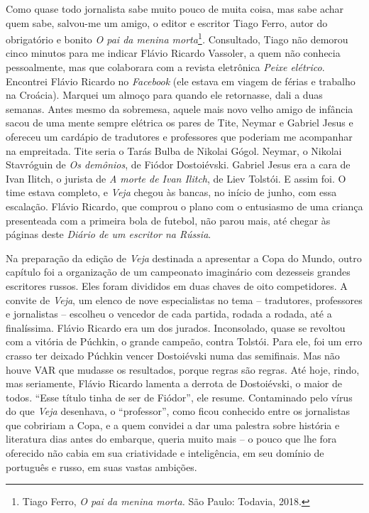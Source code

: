 Como quase todo jornalista sabe muito pouco de muita coisa, mas sabe
achar quem sabe, salvou-me um amigo, o editor e escritor Tiago Ferro,
autor do obrigatório e bonito \emph{O pai da menina morta}\footnote{Tiago
  Ferro, \emph{O pai da menina morta.} São Paulo: Todavia, 2018.}\emph{.}
Consultado, Tiago não demorou cinco minutos para me indicar Flávio
Ricardo Vassoler, a quem não conhecia pessoalmente, mas que colaborara
com a revista eletrônica \emph{Peixe elétrico}. Encontrei Flávio Ricardo
no \emph{Facebook} (ele estava em viagem de férias e trabalho na
Croácia). Marquei um almoço para quando ele retornasse, dali a duas
semanas. Antes mesmo da sobremesa, aquele mais novo velho amigo de
infância sacou de uma mente sempre elétrica os pares de Tite, Neymar e
Gabriel Jesus e ofereceu um cardápio de tradutores e professores que
poderiam me acompanhar na empreitada. Tite seria o Tarás Bulba de
Nikolai Gógol. Neymar, o Nikolai Stavróguin de \emph{Os demônios}, de
Fiódor Dostoiévski. Gabriel Jesus era a cara de Ivan Ilitch, o jurista
de \emph{A morte de Ivan Ilitch}, de Liev Tolstói. E assim foi. O time
estava completo, e \emph{Veja} chegou às bancas, no início de junho, com
essa escalação. Flávio Ricardo, que comprou o plano com o entusiasmo de
uma criança presenteada com a primeira bola de futebol, não parou mais,
até chegar às páginas deste \emph{Diário de um escritor na Rússia}.

Na preparação da edição de \emph{Veja} destinada a apresentar a Copa do
Mundo, outro capítulo foi a organização de um campeonato imaginário com
dezesseis grandes escritores russos. Eles foram divididos em duas chaves
de oito competidores. A convite de \emph{Veja}, um elenco de nove
especialistas no tema -- tradutores, professores e jornalistas --
escolheu o vencedor de cada partida, rodada a rodada, até a finalíssima.
Flávio Ricardo era um dos jurados. Inconsolado, quase se revoltou com a
vitória de Púchkin, o grande campeão, contra Tolstói. Para ele, foi um
erro crasso ter deixado Púchkin vencer Dostoiévski numa das semifinais.
Mas não houve VAR que mudasse os resultados, porque regras são regras.
Até hoje, rindo, mas seriamente, Flávio Ricardo lamenta a derrota de
Dostoiévski, o maior de todos. ``Esse título tinha de ser de Fiódor'',
ele resume. Contaminado pelo vírus do que \emph{Veja} desenhava, o
``professor'', como ficou conhecido entre os jornalistas que cobririam a
Copa, e a quem convidei a dar uma palestra sobre história e literatura
dias antes do embarque, queria muito mais -- o pouco que lhe fora
oferecido não cabia em sua criatividade e inteligência, em seu domínio
de português e russo, em suas vastas ambições.

